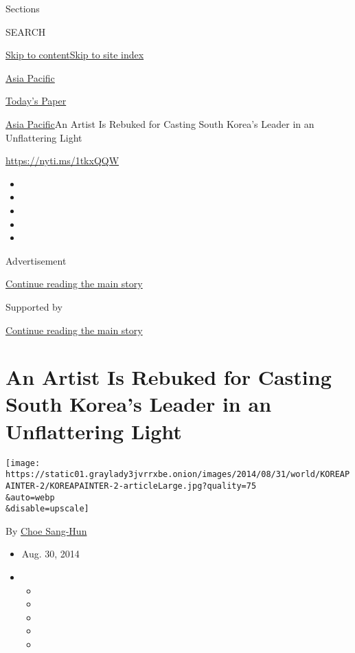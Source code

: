 Sections

SEARCH

\protect\hyperlink{site-content}{Skip to
content}\protect\hyperlink{site-index}{Skip to site index}

\href{https://www.nytimes3xbfgragh.onion/section/world/asia}{Asia
Pacific}

\href{https://myaccount.nytimes3xbfgragh.onion/auth/login?response_type=cookie\&client_id=vi}{}

\href{https://www.nytimes3xbfgragh.onion/section/todayspaper}{Today's
Paper}

\href{/section/world/asia}{Asia Pacific}\textbar{}An Artist Is Rebuked
for Casting South Korea's Leader in an Unflattering Light

\url{https://nyti.ms/1tkxQQW}

\begin{itemize}
\item
\item
\item
\item
\item
\end{itemize}

Advertisement

\protect\hyperlink{after-top}{Continue reading the main story}

Supported by

\protect\hyperlink{after-sponsor}{Continue reading the main story}

\hypertarget{an-artist-is-rebuked-for-casting-south-koreas-leader-in-an-unflattering-light}{%
\section{An Artist Is Rebuked for Casting South Korea's Leader in an
Unflattering
Light}\label{an-artist-is-rebuked-for-casting-south-koreas-leader-in-an-unflattering-light}}

\texttt{[image: https://static01.graylady3jvrrxbe.onion/images/2014/08/31/world/KOREAPAINTER-2/KOREAPAINTER-2-articleLarge.jpg?quality=75\\\&auto=webp\\\&disable=upscale]}

By \href{http://www.nytimes3xbfgragh.onion/by/choe-sang-hun}{Choe
Sang-Hun}

\begin{itemize}
\item
  Aug. 30, 2014
\item
  \begin{itemize}
  \item
  \item
  \item
  \item
  \item
  \end{itemize}
\end{itemize}

